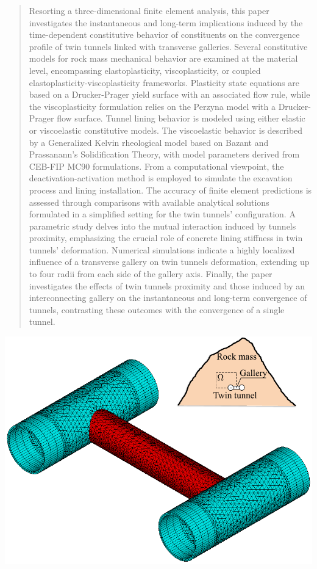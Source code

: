 \documentclass[a4paper,fleqn]{cas-sc}
\begin{document}
\begin{abstract}
Resorting a three-dimensional finite element analysis, this paper investigates the instantaneous and long-term implications induced by the time-dependent constitutive behavior of constituents on the convergence profile of twin tunnels linked with transverse galleries. Several constitutive models for rock mass mechanical behavior are examined at the material level, encompassing elastoplasticity, viscoplasticity, or coupled elastoplasticity-viscoplasticity frameworks. Plasticity state equations are based on a Drucker-Prager yield surface with an associated flow rule, while the viscoplasticity formulation relies on the Perzyna model with a Drucker-Prager flow surface. Tunnel lining behavior is modeled using either elastic or viscoelastic constitutive models. The viscoelastic behavior is described by a Generalized Kelvin rheological model based on Bazant and Prassanann's Solidification Theory, with model parameters derived from CEB-FIP MC90 formulations. From a computational viewpoint, the deactivation-activation method is employed to simulate the excavation process and lining installation. The accuracy of finite element predictions is assessed through comparisons with available analytical solutions formulated in a simplified setting for the twin tunnels' configuration. A parametric study delves into the mutual interaction induced by tunnels proximity, emphasizing the crucial role of concrete lining stiffness in twin tunnels' deformation. Numerical simulations indicate a highly localized influence of a transverse gallery on twin tunnels deformation, extending up to four radii from each side of the gallery axis. Finally, the paper investigates the effects of twin tunnels proximity and those induced by an interconnecting gallery on the instantaneous and long-term convergence of tunnels, contrasting these outcomes with the convergence of a single tunnel.
\end{abstract}

\begin{graphicalabstract}
	\includegraphics[scale=1]{graphical_abstract.pdf}
\end{graphicalabstract}
\end{document}
